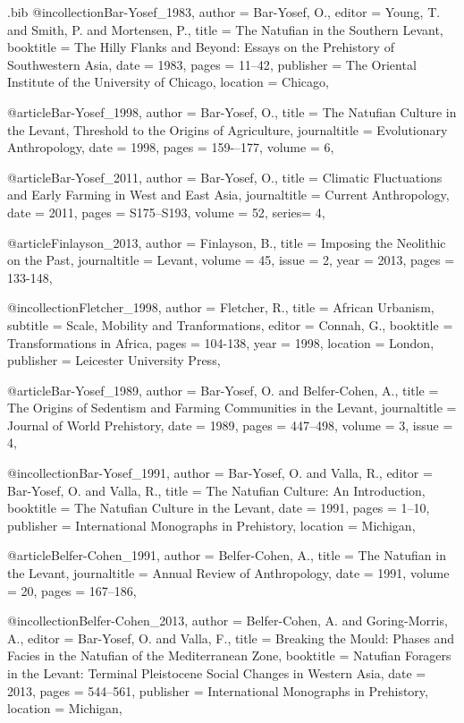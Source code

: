 \begin{filecontents}{\IJSRAidentifier.bib}
@incollection{Bar-Yosef_1983,
	author = {Bar-Yosef, O.},
	editor = {Young, T. and Smith, P. and Mortensen, P.},
	title = {The Natufian in the Southern Levant},
	booktitle = {The Hilly Flanks and Beyond: Essays on the Prehistory of 	Southwestern Asia},
	date = {1983},
	pages = {11--42},
	publisher = {The Oriental Institute of the University of Chicago},
	location = {Chicago},
}

@article{Bar-Yosef_1998,
	author = {Bar-Yosef, O.},
	title = {The Natufian Culture in the Levant, Threshold to the Origins of 	Agriculture},
	journaltitle = {Evolutionary Anthropology},
	date = {1998},
	pages = {159-–177},
	volume = {6},
}

@article{Bar-Yosef_2011,
	author = {Bar-Yosef, O.},
	title = {Climatic Fluctuations and Early Farming in West and East Asia},
	journaltitle = {Current Anthropology},
	date = {2011},
	pages = {S175--S193},
	volume = {52},
	series= {4},
}

@article{Finlayson_2013,
author = {Finlayson, B.},
title = {Imposing the Neolithic on the Past},
journaltitle = {Levant},
volume = {45},
issue = {2},
year = {2013},
pages = {133-148},
}

@incollection{Fletcher_1998,
author = {Fletcher, R.},
title = {African Urbanism},
subtitle = {Scale, Mobility and Tranformations},
editor = {Connah, G.},
booktitle = {Transformations in Africa},
pages = {104-138},
year = {1998},
location = {London},
publisher = {Leicester University Press},
}


@article{Bar-Yosef_1989,
	author = {Bar-Yosef, O. and Belfer-Cohen, A.},
	title = {The Origins of Sedentism and Farming Communities in the Levant},
	journaltitle = {Journal of World Prehistory},
	date = {1989},
	pages = {447--498},
	volume = {3},
	issue = {4},
}

@incollection{Bar-Yosef_1991,
	author = {Bar-Yosef, O. and Valla, R.},
	editor = {Bar-Yosef, O. and Valla, R.},
	title = {The Natufian Culture: An Introduction},
	booktitle = {The Natufian Culture in the Levant},
	date = {1991},
	pages = {1--10},
	publisher = {International 	Monographs in Prehistory},
	location = {Michigan},
}

@article{Belfer-Cohen_1991,
	author = {Belfer-Cohen, A.},
	title = {The Natufian in the Levant},
	journaltitle = {Annual Review of Anthropology},
	date = {1991},
	volume = {20},
	pages = {167--186},
}

@incollection{Belfer-Cohen_2013,
	author = {Belfer-Cohen, A. and Goring-Morris, A.},
	editor = {Bar-Yosef, O. and Valla, F.},
	title = {Breaking the Mould: Phases and Facies in the 	Natufian of the Mediterranean Zone},
	booktitle = {Natufian 	Foragers in the Levant: Terminal Pleistocene Social Changes in Western Asia},
	date = {2013},
	pages = {544--561},
	publisher = {International 	Monographs in Prehistory},
	location = {Michigan},
}


\end{filecontents}
